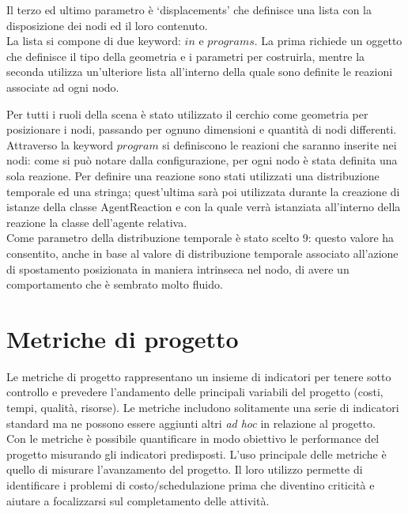 Il terzo ed ultimo parametro è `displacements' che definisce una lista con la disposizione dei nodi ed il loro contenuto.
\\
La lista si compone di due keyword: $in$ e $programs$. La prima richiede un oggetto che definisce il tipo della geometria e i parametri per costruirla, mentre la seconda utilizza un'ulteriore lista all'interno della quale sono definite le reazioni associate ad ogni nodo.

Per tutti i ruoli della scena è stato utilizzato il cerchio come geometria per posizionare i nodi, passando per ognuno dimensioni e quantità di nodi differenti.
\\
Attraverso la keyword $program$ si definiscono le reazioni che saranno inserite nei nodi: come si può notare dalla configurazione, per ogni nodo è stata definita una sola reazione.
Per definire una reazione sono stati utilizzati una distribuzione temporale ed una stringa; quest'ultima sarà poi utilizzata durante la creazione di istanze della classe AgentReaction e con la quale verrà istanziata all'interno della reazione la classe dell'agente relativa.
\\
Come parametro della distribuzione temporale è stato scelto 9: questo valore ha consentito, anche in base al valore di distribuzione temporale associato all'azione di spostamento posizionata in maniera intrinseca nel nodo, di avere un comportamento che è sembrato molto fluido.


\section{Metriche di progetto}
Le metriche di progetto rappresentano un insieme di indicatori per tenere sotto controllo e prevedere l'andamento delle principali variabili del progetto (costi, tempi, qualità, risorse).
Le metriche includono solitamente una serie di indicatori standard ma ne possono essere aggiunti altri \textit{ad hoc} in relazione al progetto.
\\
Con le metriche è possibile quantificare in modo obiettivo le performance del progetto misurando gli indicatori predisposti. L'uso principale delle metriche è quello di misurare l'avanzamento del progetto. Il loro utilizzo permette di identificare i problemi di costo/schedulazione prima che diventino criticità e aiutare a focalizzarsi sul completamento delle attività.

